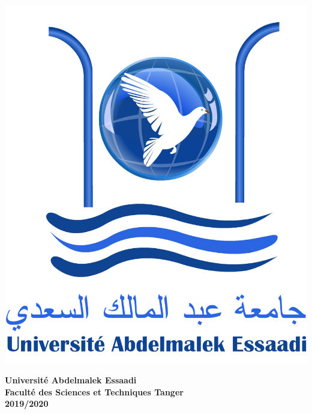 \begin{titlepage}

\noindent
\begin{minipage}{0.17\textwidth}
      \includegraphics[width=\linewidth]{resources/uae.jpg}
\end{minipage}
\hfill
\begin{minipage}{0.5\textwidth}
  \begin{center}
    \textbf{\large Université Abdelmalek Essaadi}\\[0.3cm] %
    \textbf{\large Faculté des Sciences et Techniques Tanger}\\[0.5cm] %
    \textbf{\large 2019/2020}\\[1.5cm]
  \end{center}
    

\end{minipage}
\end{titlepage}
